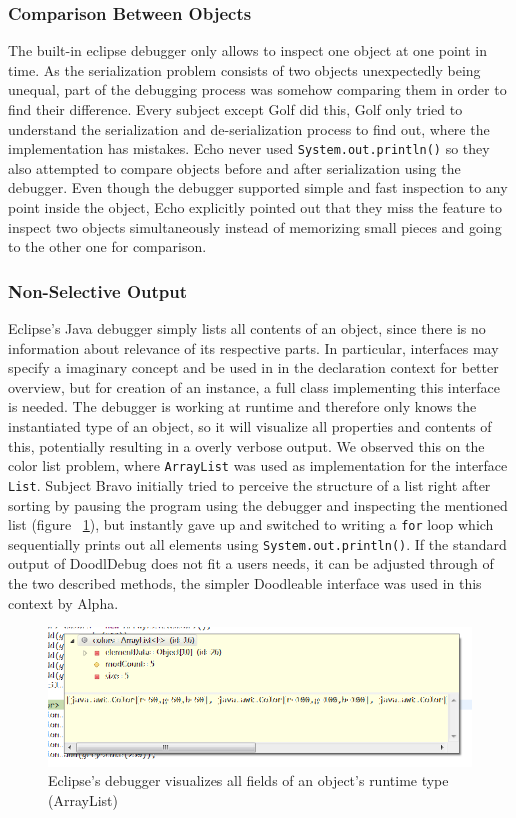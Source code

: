 \documentclass[a4paper,ngerman,english]{amsbook} %
\newcommand{\nb}[2]{\nbc{#1}{#2}{orange}}
\newcommand\todo[1]{\nb{TO DO}{#1}}
\begin{document}
\subsubsection{Comparison Between Objects}
The built-in eclipse debugger only allows to inspect one object at one point in time. As the serialization problem consists of two objects unexpectedly  being unequal, part of the debugging process was somehow comparing them in order to find their difference. Every subject except Golf did this, Golf only tried to understand the serialization and de-serialization process to find out, where the implementation has mistakes. Echo never used \verb-System.out.println()- so they also attempted to compare objects before and after serialization using the debugger. Even though the debugger supported simple and fast inspection to any point inside the object, Echo explicitly pointed out that they miss the feature to inspect two objects simultaneously instead of memorizing small pieces and going to the other one for comparison.

\subsubsection{Non-Selective Output}
Eclipse's Java debugger simply lists all contents of an object, since there is no information about relevance of its respective parts. In particular, interfaces may specify a imaginary concept and be used in in the declaration context for better overview, but for creation of an instance, a full class implementing this interface is needed. The debugger is working at runtime and therefore only knows the instantiated type of an object, so it will visualize all properties and contents of this, potentially resulting in a overly verbose output. We observed this on the color list problem, where \verb.ArrayList. was used as implementation for the interface \verb.List.. Subject Bravo initially tried to perceive the structure of a list right after sorting by pausing the program  using the debugger and inspecting the mentioned list (figure ~\ref{debugger_color-list}), but instantly gave up and switched to writing a \verb.for. loop which sequentially prints out all elements using \verb-System.out.println()-. If the standard output of DoodlDebug does not fit a users needs, it can be adjusted through of the two described methods, the simpler Doodleable interface was used in this context by Alpha. \todo{Screenshot of Doodleable usage}
\begin{figure}[h]
	\includegraphics[width=\textwidth]{img/debugger_color-list_remo.png}
	\caption[Bravo using the debugger for a color list]{Eclipse's debugger visualizes all fields of an object's runtime type (ArrayList)}
	\label{debugger_color-list}
\end{figure}
\end{document}

